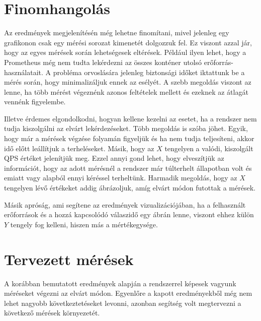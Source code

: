 \section{Finomhangolás}
Az eredmények megjelenítésén még lehetne finomítani, mivel jelenleg egy grafikonon csak egy mérési sorozat kimenetét dolgozzuk fel. Ez viszont azzal jár, hogy az egyes mérések során lehetségesek eltérések. Például ilyen lehet, hogy a Prometheus még nem tudta lekérdezni az összes konténer utolsó erőforrás-használatait. A probléma orvoslására jelenleg biztonsági időket iktattunk be a mérés során, hogy minimalizáljuk ennek az esélyét. A szebb megoldás viszont az lenne, ha több mérést végeznénk azonos feltételek mellett és ezeknek az átlagát vennénk figyelembe.

Illetve érdemes elgondolkodni, hogyan kellene kezelni az esetet, ha a rendszer nem tudja kiszolgálni az elvárt lekérdezéseket. Több megoldás is szóba jöhet. Egyik, hogy már a mérések végzése folyamán figyeljük és ha nem tudja teljesíteni, akkor idő előtt leállítjuk a terheléseket. Másik, hogy az $X$ tengelyen a valódi, kiszolgált QPS értéket jelenítjük meg. Ezzel annyi gond lehet, hogy elveszítjük az információt, hogy az adott mérésnél a rendszer már túlterhelt állapotban volt és emiatt vagy alapból ennyi kéréssel terheltünk. Harmadik megoldás, hogy az $X$ tengelyen lévő értékeket addig ábrázoljuk, amíg elvárt módon futottak a mérések.

Másik apróság, ami segítene az eredmények vizualizációjában, ha a felhasznált erőforrások és a hozzá kapcsolódó válaszidő egy ábrán lenne, viszont ehhez külön $Y$ tengely fog kelleni, hiszen más a mértékegysége.  

\section{Tervezett mérések}
A korábban bemutatott eredmények alapján a rendszerrel képesek vagyunk méréseket végezni az elvárt módon. Egyenlőre a kapott eredményekből még nem lehet nagyobb következtetéseket levonni, azonban segítség volt megtervezni a következő mérések környezetét. 

